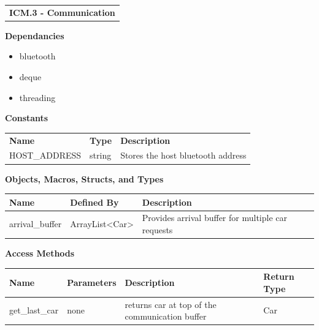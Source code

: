 \documentclass [10pt]{article}
\begin{document}
\begin{longtable}{p{}}
\rowcolor{subsectionC}\textbf{ICM.3 - Communication} \\
\end{longtable}
  




\textbf{Dependancies } 

\begin{itemize}
    \itemsep 0pt
    \item bluetooth 
    \item deque
    \item threading
    
\end{itemize}

\textbf{Constants}
\begin{longtable}{ p{ }  p{ } p{}} \\ 
\rowcolor{tableCell} \textbf{Name} & \textbf{Type} & \textbf{Description} \\
\rowcolor{tableCell} HOST\_ADDRESS & string & Stores the host bluetooth address\\ 
\end{longtable}




\textbf{Objects, Macros, Structs, and Types}
\begin{longtable}{ p{ }  p{ } p{}} \\ 

\rowcolor{tableCell} \textbf{Name} & \textbf{Defined By} & \textbf{Description} \\\hline
\rowcolor{tableCell} arrival\_buffer & ArrayList<Car> & Provides arrival buffer for multiple car requests


\end{longtable}



\textbf{Access Methods}


\begin{longtable}{ p{ }  p{ } p{} p{}} \\ 

\rowcolor{tableCell} \textbf{Name} & \textbf{Parameters} & \textbf{Description} &\textbf{Return Type} \\\hline
\rowcolor{tableCell} get\_last\_car & none & returns car at top of the communication buffer & Car\\


\end{longtable}
\end{document}
